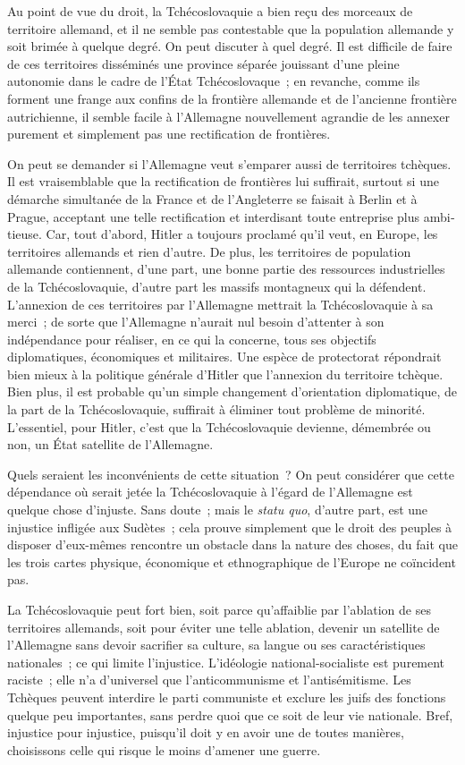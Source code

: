 \documentclass[french,twoside]{book} %
\begin{document}
\noindent Au point de vue du droit, la Tchécoslovaquie a bien reçu des morceaux de territoire allemand, et il ne semble pas contestable que la population alleman­de y soit brimée à quelque degré. On peut discuter à quel degré. Il est difficile de faire de ces territoires disséminés une province séparée jouissant d'une pleine autonomie dans le cadre de l'État Tchécoslovaque ; en revanche, com­me ils forment une frange aux confins de la frontière allemande et de l'ancienne frontière autrichienne, il semble facile à l'Allemagne nouvellement agrandie de les annexer purement et simplement pas une rectification de frontières.\par
On peut se demander si l'Allemagne veut s'emparer aussi de territoires tchèques. Il est vraisemblable que la rectification de frontières lui suffirait, surtout si une démarche simultanée de la France et de l'Angleterre se faisait à Berlin et à Prague, acceptant une telle rectification et interdisant toute entre­prise plus ambi­tieuse. Car, tout d'abord, Hitler a toujours proclamé qu'il veut, en Europe, les territoires allemands et rien d'autre. De plus, les territoires de population allemande contiennent, d'une part, une bonne partie des ressources industrielles de la Tchécoslovaquie, d'autre part les massifs montagneux qui la défendent. L'annexion de ces territoires par l'Allemagne mettrait la Tchécos­lovaquie à sa merci ; de sorte que l'Allemagne n'aurait nul besoin d'attenter à son indépendance pour réaliser, en ce qui la concerne, tous ses objectifs diplomatiques, économiques et militaires. Une espèce de protectorat répon­drait bien mieux à la politique générale d'Hitler que l'annexion du territoire tchèque. Bien plus, il est probable qu'un simple changement d'orientation diplomatique, de la part de la Tchécoslovaquie, suffirait à éliminer tout pro­blème de minorité. L'essentiel, pour Hitler, c'est que la Tchécoslovaquie devienne, démembrée ou non, un État satellite de l'Allemagne.\par
Quels seraient les inconvénients de cette situation ? On peut considérer que cette dépendance où serait jetée la Tchécoslovaquie à l'égard de l'Allema­gne est quelque chose d'injuste. Sans doute ; mais le {\itshape statu quo}, d'autre part, est une injustice infligée aux Sudètes ; cela prouve simplement que le droit des peuples à disposer d'eux-mêmes rencontre un obstacle dans la nature des choses, du fait que les trois cartes physique, économique et ethnographique de l'Europe ne coïncident pas.\par
La Tchécoslovaquie peut fort bien, soit parce qu'affaiblie par l'ablation de ses territoires allemands, soit pour éviter une telle ablation, devenir un satellite de l'Allemagne sans devoir sacrifier sa culture, sa langue ou ses caractéris­tiques nationales ; ce qui limite l'injustice. L'idéologie national-socialiste est purement raciste ; elle n'a d'universel que l'anticommunisme et l'antisémi­tisme. Les Tchèques peuvent interdire le parti communiste et exclure les juifs des fonctions quelque peu importantes, sans perdre quoi que ce soit de leur vie nationale. Bref, injustice pour injustice, puisqu'il doit y en avoir une de toutes manières, choisissons celle qui risque le moins d'amener une guerre.\par
\end{document}
